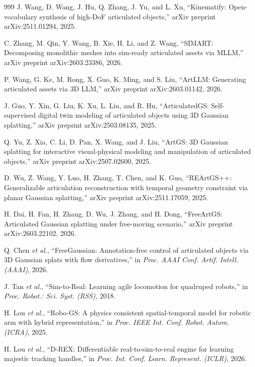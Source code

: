 \documentclass[12pt,a4paper,oneside]{report}
\begin{document}
\begin{thebibliography}{999}
J. Wang, D. Wang, J. Hu, Q. Zhang, J. Yu, and L. Xu, ``Kinematify: Open-vocabulary synthesis of high-{DoF} articulated objects,'' arXiv preprint arXiv:2511.01294, 2025.

C. Zhang, M. Qin, Y. Wang, B. Xie, H. Li, and Z. Wang, ``{SIMART}: Decomposing monolithic meshes into sim-ready articulated assets via {MLLM},'' arXiv preprint arXiv:2603.23386, 2026.

P. Wang, G. Ke, M. Rong, X. Guo, K. Ming, and S. Liu, ``ArtLLM: Generating articulated assets via {3D} LLM,'' arXiv preprint arXiv:2603.01142, 2026.

J. Guo, Y. Xin, G. Liu, K. Xu, L. Liu, and R. Hu, ``{ArticulatedGS}: Self-supervised digital twin modeling of articulated objects using {3D} Gaussian splatting,'' arXiv preprint arXiv:2503.08135, 2025.

Q. Yu, Z. Xia, C. Li, D. Pan, X. Wang, and J. Liu, ``{ArtGS}: {3D} Gaussian splatting for interactive visual-physical modeling and manipulation of articulated objects,'' arXiv preprint arXiv:2507.02600, 2025.

D. Wu, Z. Wang, Y. Luo, H. Zhang, T. Chen, and K. Guo, ``{REArtGS++}: Generalizable articulation reconstruction with temporal geometry constraint via planar Gaussian splatting,'' arXiv preprint arXiv:2511.17059, 2025.

H. Dai, H. Fan, H. Zhang, D. Wu, J. Zhang, and H. Dong, ``{FreeArtGS}: Articulated Gaussian splatting under free-moving scenario,'' arXiv preprint arXiv:2603.22102, 2026.

Q. Chen \textit{et al.}, ``{FreeGaussian}: Annotation-free control of articulated objects via {3D} Gaussian splats with flow derivatives,'' in \textit{Proc. AAAI Conf. Artif. Intell. (AAAI)}, 2026.

J. Tan \textit{et al.}, ``{Sim-to-Real}: Learning agile locomotion for quadruped robots,'' in \textit{Proc. Robot.: Sci. Syst. (RSS)}, 2018.

H. Lou \textit{et al.}, ``{Robo-GS}: A physics consistent spatial-temporal model for robotic arm with hybrid representation,'' in \textit{Proc. IEEE Int. Conf. Robot. Autom. (ICRA)}, 2025.

H. Lou \textit{et al.}, ``D-REX: Differentiable real-to-sim-to-real engine for learning majestic tracking handles,'' in \textit{Proc. Int. Conf. Learn. Represent. (ICLR)}, 2026.


\end{thebibliography}
\end{document}

